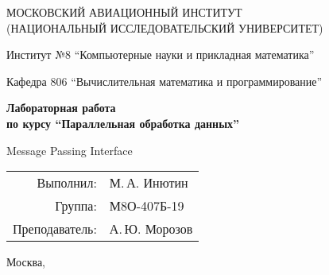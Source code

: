 \begin{titlepage}
\begin{center}
\large
МОСКОВСКИЙ АВИАЦИОННЫЙ ИНСТИТУТ\\ (НАЦИОНАЛЬНЫЙ ИССЛЕДОВАТЕЛЬСКИЙ УНИВЕРСИТЕТ)

\vspace{20pt}

Институт №8 \enquote{Компьютерные науки и прикладная математика}

Кафедра 806 \enquote{Вычислительная математика и программирование}
\end{center}

\vspace{60pt}

\begin{center}
\bfseries
\large
Лабораторная работа  \\по курсу \enquote{Параллельная обработка данных}

\vspace{54pt}

Message Passing Interface
\end{center}

\vfill

\begin{flushright}
\large
\begin{tabular}{rl}
Выполнил: & М.\,А. Инютин \\
Группа: & М8О-407Б-19 \\
Преподаватель: & А.\,Ю. Морозов \\
\end{tabular}
\end{flushright}

\vspace{92pt}

\begin{center}
\large
Москва, \the\year
\end{center}
\end{titlepage}

\pagebreak
